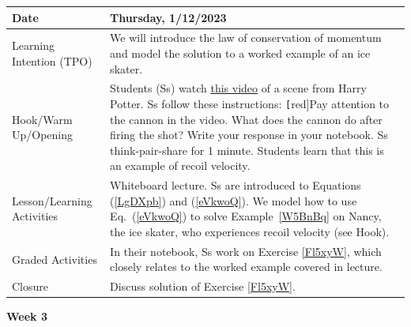 \documentclass{article}
\numberwithin{equation}{section}
\numberwithin{figure}{section}
\begin{document}
\begin{tabular}{|m{}|m{}|}
    \hline
    \cellcolor{black!20}\textbf{Date} & \cellcolor{black!20}\textbf{Thursday, 1/12/2023} \\
    \hline
    Learning Intention (TPO) & We will introduce the law of conservation of momentum and model the solution to a worked example of an ice skater. \\
    \hline
    Hook/Warm Up/Opening & Students (Ss) watch \href{https://youtu.be/UqLJjqESlJY}{this video} of a scene from Harry Potter. Ss follow these instructions: \texttt[red]{Pay attention to the cannon in the video. What does the cannon do after firing the shot? Write your response in your notebook.} Ss think-pair-share for 1 minute. Students learn that this is an example of recoil velocity.\\
    \hline
    Lesson/Learning Activities & Whiteboard lecture. Ss are introduced to Equations (\ref{LgDXpb}) and (\ref{eVkwoQ}). We model how to use Eq.~(\ref{eVkwoQ}) to solve Example~\ref{W5BnBq} on Nancy, the ice skater, who experiences recoil velocity (see Hook).\\
    \hline
    Graded Activities & In their notebook, Ss work on Exercise \ref{Fl5xyW}, which closely relates to the worked example covered in lecture.\\
    \hline
    Closure & Discuss solution of Exercise \ref{Fl5xyW}.\\
    \hline
\end{tabular}
\vspace{1ex}

\textbf{Week 3}
\vspace{1ex}
\end{document}
